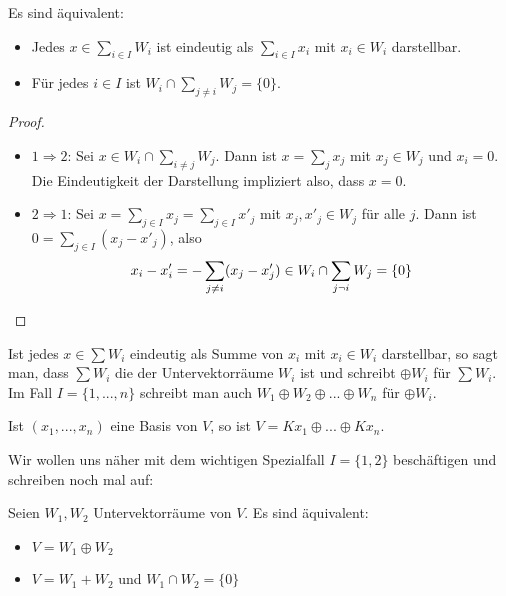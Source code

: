 \begin{proposition}
	Es sind äquivalent:
	\begin{itemize}
		\item Jedes $x\in\sum_{i \in I} W_i$ ist eindeutig als $\sum_{i \in I} x_i$ mit $x_i\in W_i$ darstellbar.
		\item Für jedes $i\in I$ ist $W_i\cap\sum_{j\neq i} W_j=\{0\}$.
	\end{itemize}
\end{proposition}
\begin{proof}
	\begin{itemize}
		\item $1\Rightarrow 2$: Sei $x\in W_i\cap\sum_{i\neq j} W_j$. Dann ist $x=\sum_j x_j$ mit $x_j\in W_j$ und $x_i=0$. Die Eindeutigkeit der Darstellung impliziert also, dass $x=0$.
		\item $2\Rightarrow 1$: Sei $x=\sum_{j\in I}x_j=\sum_{j\in I}x'_j$ mit $x_j,x'_j\in W_j$ für alle $j$. Dann ist $0=\sum_{j\in I}(x_j-x'_j)$, also
		\begin{align}
			x_i-x'_i=-\sum_{j\neq i}(x_j-x'_j)\in W_i\cap \sum_{j\neg i} W_j=\{0\}\notag
		\end{align}
	\end{itemize}
\end{proof}

\begin{definition}
	Ist jedes $x\in \sum W_i$ eindeutig als Summe von $x_i$ mit $x_i\in W_i$ 
	darstellbar, so sagt man, dass $\sum W_i$ die  der Untervektorräume $W_i$ ist und schreibt $\oplus W_i$ für 
	$\sum W_i$. Im Fall $I=\{1,...,n\}$ schreibt man auch $W_1\oplus W_2 \oplus ... \oplus W_n$ für $\oplus W_i$.
\end{definition}

\begin{example}
	Ist $(x_1,...,x_n)$ eine Basis von $V$, so ist $V=Kx_1\oplus ... \oplus Kx_n$. 
\end{example}

\begin{remark}
	Wir wollen uns näher mit dem wichtigen Spezialfall $I=\{1,2\}$ beschäftigen und schreiben noch 
	mal auf: 
\end{remark}

\begin{conclusion}
	Seien $W_1,W_2$ Untervektorräume von $V$. Es sind äquivalent:
	\begin{itemize}
		\item $V=W_1\oplus W_2$
		\item $V=W_1 + W_2$ und $W_1 \cap W_2 = \{0\}$
	\end{itemize}
\end{conclusion}

